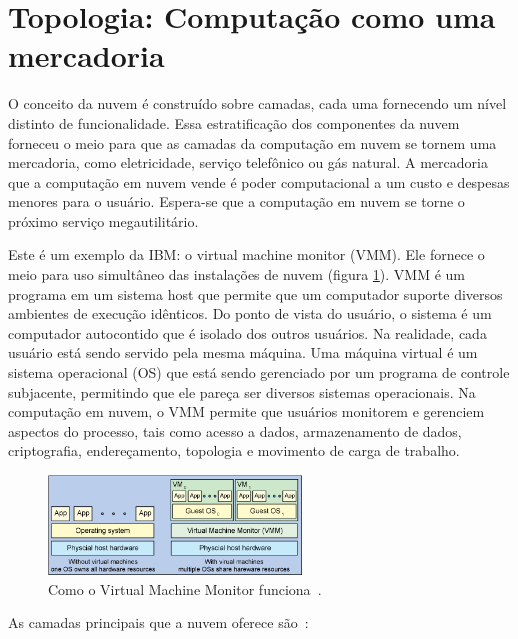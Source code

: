 \section{Topologia: Computação como uma mercadoria}

O conceito da nuvem é construído sobre camadas, cada uma fornecendo um nível
distinto de funcionalidade. Essa estratificação dos componentes da nuvem forneceu o
meio para que as camadas da computação em nuvem se tornem uma mercadoria, como
eletricidade, serviço telefônico ou gás natural. A mercadoria que a computação em
nuvem vende é poder computacional a um custo e despesas menores para o usuário.
Espera-se que a computação em nuvem se torne o próximo serviço megautilitário.

Este é um exemplo da IBM: o virtual machine monitor (VMM). Ele fornece o meio para
uso simultâneo das instalações de nuvem (figura \ref{fig:vmm}). VMM é um programa em
um sistema host que permite que um computador suporte diversos ambientes de execução
idênticos. Do ponto de vista do usuário, o sistema é um computador autocontido que
é isolado dos outros usuários. Na realidade, cada usuário está sendo servido pela
mesma máquina. Uma máquina virtual é um sistema operacional (OS) que está sendo
gerenciado por um programa de controle subjacente, permitindo que ele pareça ser
diversos sistemas operacionais. Na computação em nuvem, o VMM permite que usuários
monitorem e gerenciem aspectos do processo, tais como acesso a dados, armazenamento
de dados, criptografia, endereçamento, topologia e movimento de carga de trabalho. 


\begin{figure}[ht]
    \centering
    \includegraphics[width=0.6\textwidth]{img/vmm.png}
    \caption{Como o Virtual Machine Monitor funciona~\cite{cloud-computing-fundamentals}.}
    \label{fig:vmm}
\end{figure}


As camadas principais que a nuvem oferece são~\cite{cloud-computing-fundamentals}:

\newcommand{\itemm}[1]{\item\textbf{#1}}

